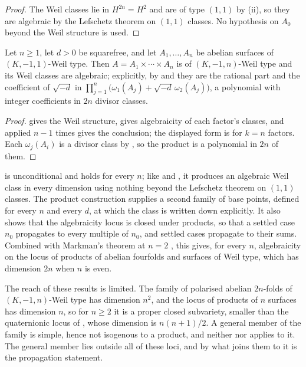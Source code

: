 \begin{proof}
The Weil classes lie in $H^{2n}=H^{2}$ and are of type $(1,1)$ by
(ii), so they are algebraic by the Lefschetz theorem on
$(1,1)$ classes. No hypothesis on $A_{0}$ beyond the Weil structure is used.
\end{proof}

\begin{theorem}\label{thm:everyn}
Let $n\ge1$, let $d>0$ be squarefree, and let $A_{1},\dots,A_{n}$ be abelian
surfaces of $(K,-1,1)$-Weil type. Then $A=A_{1}\times\cdots\times A_{n}$ is of
$(K,-1,n)$-Weil type and its Weil classes are algebraic; explicitly, by
 and  they are the rational part and
the coefficient of $\sqrt{-d}$ in
$\prod_{j=1}^{n}\bigl(\omega_{1}(A_{j})+\sqrt{-d}\,\omega_{2}(A_{j})\bigr)$,
a polynomial with integer coefficients in $2n$ divisor classes.
\end{theorem}

\begin{proof}
 gives the Weil structure,  gives
algebraicity of each factor's classes, and  applied $n-1$
times gives the conclusion; the displayed form is  for $k=n$
factors. Each $\omega_{j}(A_{i})$ is a divisor class by
, so the product is a polynomial in $2n$ of them.
\end{proof}

\begin{remark}\label{rem:prodscope}
 is unconditional and holds for every $n$; like
 and , it produces an algebraic
Weil class in every dimension using nothing beyond the Lefschetz theorem on
$(1,1)$ classes. The product construction supplies a second family of base
points, defined for every $n$ and every $d$, at which the class is written
down explicitly. It also shows that the algebraicity locus is closed under
products, so that a settled case $n_{0}$ propagates to every multiple of
$n_{0}$, and settled cases propagate to their sums. Combined with Markman's
theorem at $n=2$ \cite{Mar25a,Mar25b}, this gives, for every $n$,
algebraicity on the locus of products of abelian fourfolds and surfaces of
Weil type, which has dimension $2n$ when $n$ is even.

The reach of these results is limited. The family of polarised abelian
$2n$-folds of $(K,-1,n)$-Weil type has dimension $n^{2}$, and the locus of
products of $n$ surfaces has dimension $n$, so for $n\ge2$ it is a proper
closed subvariety, smaller than the quaternionic locus of ,
whose dimension is $n(n+1)/2$. A general member of the family is simple,
hence not isogenous to a product, and neither  nor
 applies to it. The general member lies outside all
of these loci, and by  what joins them to it is the
propagation statement.
\end{remark}


